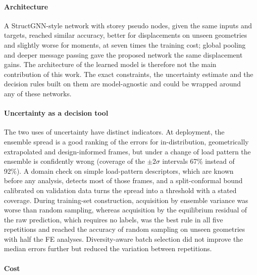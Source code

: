 \paragraph{Architecture} A StructGNN-style network with storey pseudo nodes, given the same inputs and targets, reached similar accuracy, better for displacements on unseen geometries and slightly worse for moments, at seven times the training cost; global pooling and deeper message passing gave the proposed network the same displacement gains. The architecture of the learned model is therefore not the main contribution of this work. The exact constraints, the uncertainty estimate and the decision rules built on them are model-agnostic and could be wrapped around any of these networks.

\paragraph{Uncertainty as a decision tool} The two uses of uncertainty have distinct indicators. At deployment, the ensemble spread is a good ranking of the errors for in-distribution, geometrically extrapolated and design-informed frames, but under a change of load pattern the ensemble is confidently wrong (coverage of the $\pm2\sigma$ intervals 67\% instead of 92\%). A domain check on simple load-pattern descriptors, which are known before any analysis, detects most of those frames, and a split-conformal bound calibrated on validation data turns the spread into a threshold with a stated coverage. During training-set construction, acquisition by ensemble variance was worse than random sampling, whereas acquisition by the equilibrium residual of the raw prediction, which requires no labels, was the best rule in all five repetitions and reached the accuracy of random sampling on unseen geometries with half the FE analyses. Diversity-aware batch selection did not improve the median errors further but reduced the variation between repetitions.

\paragraph{Cost} 

